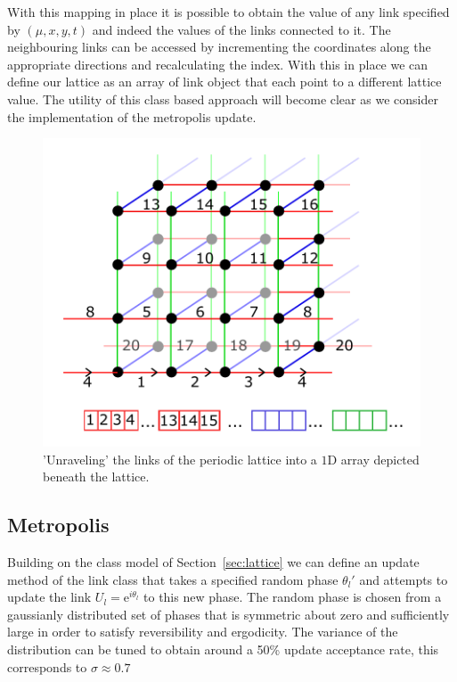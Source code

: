 \documentclass[12pt]{article}
\begin{document}
\par With this mapping in place it is possible to obtain the value of any link specified by $(\mu,x,y,t)$ and indeed the values of the links connected to it. The neighbouring links can be accessed by incrementing the coordinates along the appropriate directions and recalculating the index. With this in place we can define our lattice as an array of link object that each point to a different lattice value. The utility of this class based approach will become clear as we consider the implementation of the metropolis update.

%



\begin{figure}
\centering
\includegraphics[width=0.6\linewidth]{latticeunpack.pdf}
\caption{'Unraveling' the links of the periodic lattice into a $1\mathrm{D}$ array depicted beneath the lattice.}
\label{fig:latticeunpack}
\end{figure}

\subsection{Metropolis}
Building on the class model of Section~\ref{sec:lattice} we can define an update method of the link class that takes a specified random phase $\theta_l'$ and attempts to update the link $U_l = \mathrm{e}^{i\theta_l}$ to this new phase. The random phase is chosen from a gaussianly distributed set of phases that is symmetric about zero and sufficiently large in order to satisfy reversibility and ergodicity. The variance of the distribution can be tuned to obtain around a 50\% update acceptance rate, this corresponds to $\sigma \approx 0.7$
\end{document}
